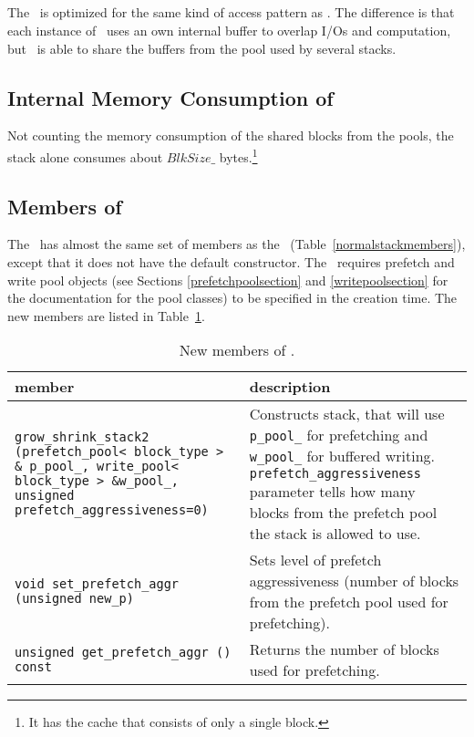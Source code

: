 \documentclass[twoside]{book}
\begin{document}
\subsection{\xgsstacktwo}
The \xgsstacktwo\ is optimized for the same kind of access pattern as
\xgsstack. The difference is that each instance of \xgsstack\ uses
an own internal buffer to overlap I/Os and computation, but
\xgsstacktwo\ is able to share the buffers from the pool used by
several stacks. 


\subsection*{Internal Memory Consumption of \xgsstacktwo}
Not counting the memory consumption of the shared blocks from the
pools, the stack alone consumes about $BlkSize\_$ bytes.\footnote{It has
the cache that consists of only a single block.}

\subsection*{Members of \xgsstacktwo}
The \xgsstacktwo\ has almost the same set of members as the
\xnormalstack\
(Table~\ref{normalstackmembers}), except that it does not have the
default constructor. The \xgsstacktwo\ requires
prefetch and write pool objects (see Sections
\ref{prefetchpoolsection} and \ref{writepoolsection} for the
documentation for the pool classes) to be specified in the creation
time. 
The new members are listed in Table~\ref{gsstacktwomembers}.

\begin{table}[h]
\begin{center}
\caption{New members of \xgsstacktwo.}
\label{gsstacktwomembers}
\begin{tabular}{|p{6cm}|p{5cm}|}
\hline
member & description  \\
\hline\hline
\texttt{grow\_shrink\_stack2 (prefetch\_pool< block\_type > \&
p\_pool\_, write\_pool< block\_type > \&w\_pool\_, unsigned
prefetch\_aggressiveness=0)} &  Constructs stack, that will use
\texttt{p\_pool\_} for prefetching and \texttt{w\_pool\_} for buffered
writing. \texttt{prefetch\_aggressiveness} parameter tells how many
blocks from the prefetch pool the stack is allowed to use.\\  
\hline
\texttt{void set\_prefetch\_aggr (unsigned new\_p)} & Sets level of
prefetch aggressiveness (number of blocks from the prefetch pool used
for prefetching). \\
\hline
\texttt{unsigned get\_prefetch\_aggr () const} & Returns the number of
blocks used for prefetching. \\
\hline
\end{tabular}
\end{center}
\end{table}
\end{document}
